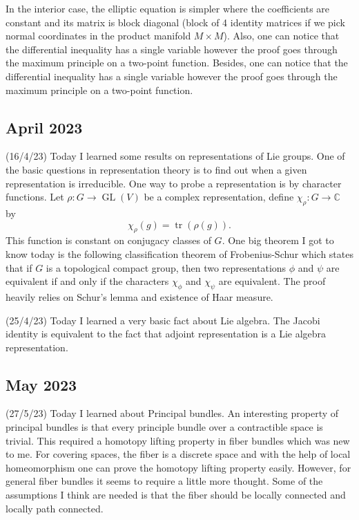 \documentclass[12pt,a4paper]{article}
\newcommand{\C}{\mathbb{C}}
\begin{document}
In the interior case, the elliptic equation is simpler where the coefficients are constant and its matrix is block diagonal (block of 4 identity matrices if we pick normal coordinates in the product manifold $M \times M$).
Also, one can notice that the differential inequality has a single variable however the proof goes through the maximum principle on a two-point function. 
Besides, one can notice that the differential inequality has a single variable however the proof goes through the maximum principle on a two-point function. 

\subsection*{April 2023}

\quad (16/4/23) Today I learned some results on representations of Lie groups. One of the basic questions in representation theory is to find out when a given representation is irreducible. One way to probe a representation is by character functions. Let $ \rho : G \to \operatorname{GL}(V) $  be a complex representation, define $ \chi_{\rho} : G \to \C $ by 
\[ \chi_{\rho}(g) = \operatorname{tr}(\rho(g)). \]
This function is constant on conjugacy classes of $ G $. One big theorem I got to know today is the following classification theorem of Frobenius-Schur which states that if $ G $ is a topological compact group, then two representations $ \phi $ and $ \psi $ are equivalent if and only if the characters $ \chi_{\phi} $ and $ \chi_{\psi} $ are equivalent. The proof heavily relies on Schur's lemma and existence of Haar measure. 

(25/4/23) Today I learned a very basic fact about Lie algebra. The Jacobi identity is equivalent to the fact that adjoint representation is a Lie algebra representation. 

\subsection*{May 2023}

\quad (27/5/23) Today I learned about Principal bundles. An interesting property of principal bundles is that every principle bundle over a contractible space is trivial. This required a homotopy lifting property in fiber bundles which was new to me. For covering spaces, the fiber is a discrete space and with the help of local homeomorphism one can prove the homotopy lifting property easily. However, for general fiber bundles it seems to require a little more thought. Some of the assumptions I think are needed is that the fiber should be locally connected and locally path connected.
\end{document}
